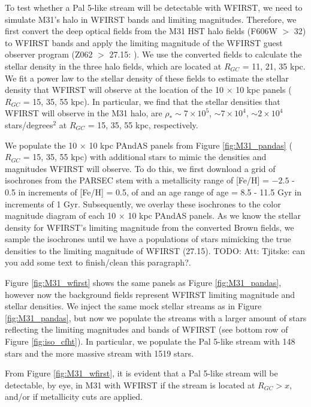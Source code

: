 \documentclass[twocolumn]{aastex62}
\newcommand{\todo}[1]{{\color{red} TODO: #1}}
\begin{document}
To test whether a Pal 5-like stream will be detectable with WFIRST, we need to simulate M31's halo in WFIRST bands and limiting magnitudes. Therefore, we first convert the deep optical fields from the \citealt{brown09} M31 HST halo fields (F606W $>$ 32) to WFIRST bands and apply the limiting magnitude of the WFIRST guest observer program (Z062 $>$ 27.15: \citealt{spergel13}). We use the converted fields to calculate the stellar density in the three \citet{brown09} halo fields, which are located at $R_{GC}$ = 11, 21, 35 kpc. We fit a power law to the stellar density of these fields to estimate the stellar density that WFIRST will observe at the location of the 10 $\times$ 10 kpc panels ($R_{GC}$ = 15, 35, 55 kpc). In particular, we find that the stellar densities that WFIRST will observe in the M31 halo, are $\rho_*  \sim 7 \times 10^5$,  $\sim7 \times 10^4$,  $\sim 2 \times 10^4$ stars/degrees$^2$ at  $R_{GC}$ = 15, 35, 55 kpc, respectively.  

We populate the 10 $\times$ 10 kpc PAndAS panels from Figure \ref{fig:M31_pandas} ($R_{GC}$ = 15, 35, 55 kpc) with additional stars to mimic the densities and magnitudes WFIRST will observe. To do this, we first download a grid of isochrones from the PARSEC stem with a metallicity range of [Fe/H] = $-2.5$ - 0.5 in increments of [Fe/H] = 0.5,  of and an age range of age = 8.5 - 11.5 Gyr in increments of 1 Gyr. Subsequently, we overlay these isochrones to the color magnitude diagram of each 10 $\times$ 10 kpc PAndAS panels. As we know the stellar density for WFIRST's limiting magnitude from the converted Brown fields, we sample the isochrones until we have a populations of stars mimicking the true densities to the limiting magnitude of WFIRST (27.15). \todo{Att: Tjitske: can you add some text to finish/clean this paragraph?}. 

Figure \ref{fig:M31_wfirst} shows the same panels as Figure \ref{fig:M31_pandas}, however now the background fields represent WFIRST limiting magnitude and stellar densities. We inject the same mock stellar streams as in Figure \ref{fig:M31_pandas}, but now we populate the streams with a larger amount of stars reflecting the limiting magnitudes and bands of WFIRST (see bottom row of Figure \ref{fig:iso_cfht}). In particular, we populate the Pal 5-like stream with 148 stars and the more massive stream with 1519 stars.

From Figure \ref{fig:M31_wfirst}, it is evident that a Pal 5-like stream will be detectable, by eye, in M31 with WFIRST if the stream is located at $R_{GC} > x$, and/or if metallicity cuts are applied.  
\end{document}
